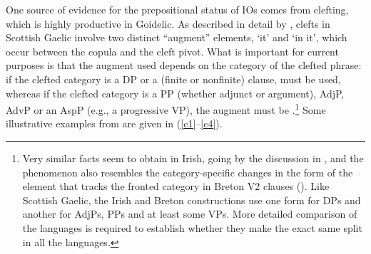 \documentclass[output=paper,colorlinks,citecolor=brown]{langscibook}
\begin{document}
One source of evidence for the prepositional status of IOs comes from clefting, which is highly productive in Goidelic. As described in detail by \citet{gt:Adger:2011}, clefts in Scottish Gaelic involve two distinct ``augment'' elements,  `it' and  `in it', which occur between the copula and the cleft pivot. What is important for current purposes is that the augment used depends on the category of the clefted phrase: if the clefted category is a DP or a (finite or nonfinite) clause,  must be used, whereas if the clefted category is a PP (whether adjunct or argument), AdjP, AdvP or an AspP (e.g., a progressive VP), the augment must be .\footnote{Very similar facts seem to obtain in Irish, going by the discussion in \citet[469]{gt:McCloskey:1984}, and the phenomenon also resembles the category-specific changes in the form of the  element that tracks the fronted category in Breton V2 clauses (\citealt{gt:Rezac:2004a}). Like Scottish Gaelic, the Irish and Breton constructions use one form for DPs and another for AdjPs, PPs and at least some VPs. More detailed comparison of the languages is required to establish whether they make the exact same split in all the languages. } Some illustrative examples from \citet{gt:Adger:2011} are given in (\ref{c1}--\ref{c4}). 




\end{document}
